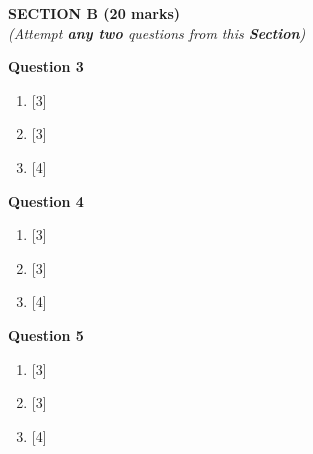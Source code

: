 \newpage
\begin{center}
   \large
   \textbf{SECTION B (20 marks)}\\
   \vspace{5mm}
   \normalsize
   \textit{(Attempt \textbf{any two} questions from this \textbf{Section})}
\end{center}
\par

\noindent
\textbf{Question 3}
\begin{enumerate}[label=(\roman*)]

    \item \hfill [3]

    \item \hfill [3]

    \item \hfill [4]

\end{enumerate}

\noindent
\textbf{Question 4}
\begin{enumerate}[label=(\roman*)]

    \item \hfill [3]

    \item \hfill [3]

    \item \hfill [4]

\end{enumerate}

\noindent
\textbf{Question 5}
\begin{enumerate}[label=(\roman*)]

    \item \hfill [3]

    \item \hfill [3]

    \item \hfill [4]

\end{enumerate}

